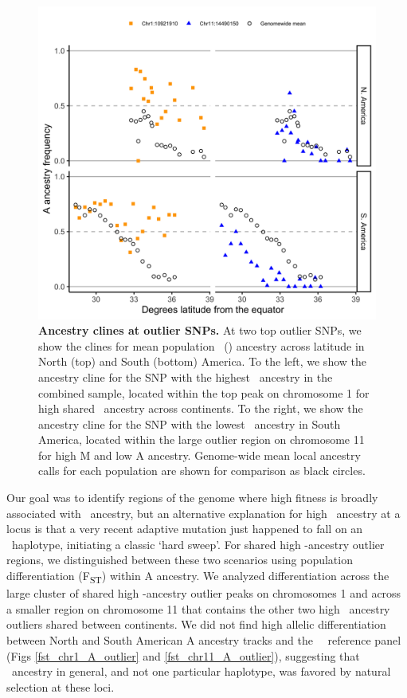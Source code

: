 \begin{figure}[ht]
\begin{center}
\includegraphics[width = .8\textwidth]{chapter1/figures/top_snp_clines.png}
\end{center}
\caption{ \textbf{Ancestry clines at outlier SNPs.} At two top outlier SNPs, we show the clines for mean population \scutellata\ (\A) ancestry across latitude in North (top) and South (bottom) America. To the left, we show the ancestry cline for the SNP with the highest \A\ ancestry in the combined sample, located within the top peak on chromosome 1 for high shared \A\ ancestry across continents. To the right, we show the ancestry cline for the SNP with the lowest \A\ ancestry in South America, located within the large outlier region on chromosome 11 for high M and low A ancestry. Genome-wide mean local ancestry calls for each population are shown for comparison as black circles.}
\label{top_snp_clines}
\end{figure}

Our goal was to identify regions of the genome where high fitness is broadly associated with \scutellata\ ancestry, but an alternative explanation for high \A\ ancestry at a locus is that a very recent adaptive mutation just happened to fall on an \A\ haplotype, initiating a classic ‘hard sweep'. For shared high \A-ancestry outlier regions, we distinguished between these two scenarios using population differentiation (F\textsubscript{ST}) within A ancestry. We analyzed differentiation across the large cluster of shared high \A-ancestry outlier peaks on chromosomes 1 and across a smaller region on chromosome 11 that contains the other two high \A\ ancestry outliers shared between continents. We did not find high allelic differentiation between North and South American A ancestry tracks and the \scutellata\ \A\ reference panel  (Figs \ref{fst_chr1_A_outlier} and \ref{fst_chr11_A_outlier}), suggesting that \scutellata\ ancestry in general, and not one particular haplotype, was favored by natural selection at these loci.

